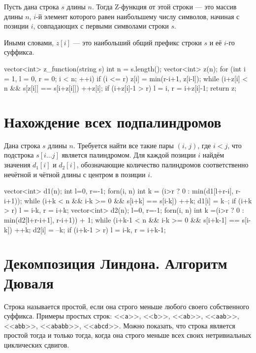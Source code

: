 \documentclass[12pt, titlepage]{article}
\renewcommand{\tt}[1]{\texttt{\small #1}}
\begin{document}
Пусть дана строка $s$ длины $n$. Тогда Z-функция от этой строки — это массив длины $n$, $i$-й элемент которого равен наибольшему числу символов, начиная с позиции $i$, совпадающих с первыми символами строки $s$.

Иными словами, $z[i]$ — это наибольший общий префикс строки $s$ и её $i$-го суффикса.

\begin{cppcode}
vector<int> z_function(string s) {
    int n = s.length();
    vector<int> z(n);
    for (int i = 1, l = 0, r = 0; i < n; ++i) {
        if (i <= r)
            z[i] = min(r-i+1, z[i-l]);
        while (i+z[i] < n && s[z[i]] == s[i+z[i]])
            ++z[i];
        if (i+z[i]-1 > r)
            l = i,  r = i+z[i]-1;
    }
    return z;
}
\end{cppcode}

\section{Нахождение всех подпалиндромов}

Дана строка $s$ длины $n$. Требуется найти все такие пары $(i,\,j)$, где $i<j$, что подстрока $s[i\ldots j]$ является палиндромом. Для каждой позиции $i$ найдём значения $d_1[i]$ и $d_2[i]$, обозначающие количество палиндромов соответственно нечётной и чётной длины с центром в позиции $i$.

\begin{cppcode}
vector<int> d1(n);
int l=0, r=-1;
forn(i, n) {
    int k = (i>r ? 0 : min(d1[l+r-i], r-i+1));
    while (i+k < n && i-k >= 0 && s[i+k] == s[i-k])  ++k;
    d1[i] = k--;
    if (i+k > r)
        l = i-k,  r = i+k;
}
vector<int> d2(n);
l=0, r=-1;
forn(i, n) {
    int k =(i>r ? 0 : min(d2[l+r-i+1], r-i+1)) + 1;
    while (i+k-1 < n && i-k >= 0 && s[i+k-1] == s[i-k])  ++k;
    d2[i] = --k;
    if (i+k-1 > r)
        l = i-k, r = i+k-1;
}
\end{cppcode}

\section{Декомпозиция Линдона. Алгоритм Дюваля}

Строка называется простой, если она строго меньше любого своего собственного суффикса. Примеры простых строк: <<\tt{a}>>, <<\tt{b}>>, <<\tt{ab}>>, <<\tt{aab}>>, <<\tt{abb}>>, <<\tt{ababb}>>, <<\tt{abcd}>>. Можно показать, что строка является простой тогда и только тогда, когда она строго меньше всех своих нетривиальных циклических сдвигов.
\end{document}
